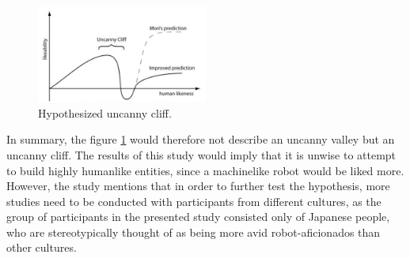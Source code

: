 \begin{figure} %
    \centering
    \includegraphics[width=0.5\textwidth]{graphics/uncanny_cliff.png}
    \caption{Hypothesized uncanny cliff.}
    \label{fig:uncannyCliff}
\end{figure}
In summary, the figure \ref{fig:uncannyCliff} would therefore not describe an uncanny valley but an uncanny cliff.
The results of this study would imply that it is unwise to attempt to build highly humanlike entities, since a machinelike robot would be liked more. However, the study mentions that in order to further test the hypothesis, more studies need to be conducted with participants from different cultures, as the group of participants in the presented study consisted only of Japanese people, who are stereotypically thought of as being more avid robot-aficionados than other cultures.

